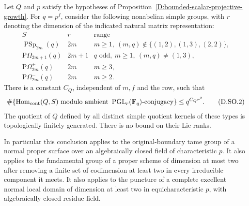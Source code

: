 \begin{corollary}
\label{D:symplectic-orthogonal-simple-product}
Let $Q$ and $p$ satisfy the hypotheses of
Proposition~\ref{D:bounded-scalar-projective-growth}.
For $q=p^f$, consider the following nonabelian simple groups, with
$r$ denoting the dimension of the indicated natural matrix representation:
\[
\begin{array}{c|c|l}
 S&r&\text{range}\\ \hline
 \operatorname{PSp}_{2m}(q)&2m&m\ge1,
       \ (m,q)\notin\{(1,2),(1,3),(2,2)\},\\
 \mathrm{P}\Omega_{2m+1}(q)&2m+1&q\text{ odd},\ m\ge1,
       \ (m,q)\ne(1,3),\\
 \mathrm{P}\Omega^{+}_{2m}(q)&2m&m\ge3,\\
 \mathrm{P}\Omega^{-}_{2m}(q)&2m&m\ge2.
\end{array}                                                   \tag{D.SO.1}
\]
There is a constant $C_Q$, independent of $m,f$ and the row, such that
\[
 \#\{\operatorname{Hom}_{\rm cont}(Q,S)
          \text{ modulo ambient }\operatorname{PGL}_r(\mathbf F_q)
          \text{-conjugacy}\}\le q^{C_Qr^2}.                  \tag{D.SO.2}
\]
The quotient of $Q$ defined by all distinct simple quotient kernels
of these types is topologically finitely generated. There is no
bound on their Lie ranks.

In particular this conclusion applies to the original-boundary tame
group of a normal proper surface over an algebraically closed field
of characteristic $p$. It also applies to the fundamental group of
a proper scheme of dimension at most two after removing a finite
set of codimension at least two in every irreducible component it meets.
It also applies to the puncture of a complete excellent normal local
domain of dimension at least two in equicharacteristic $p$, with
algebraically closed residue field.
\end{corollary}

